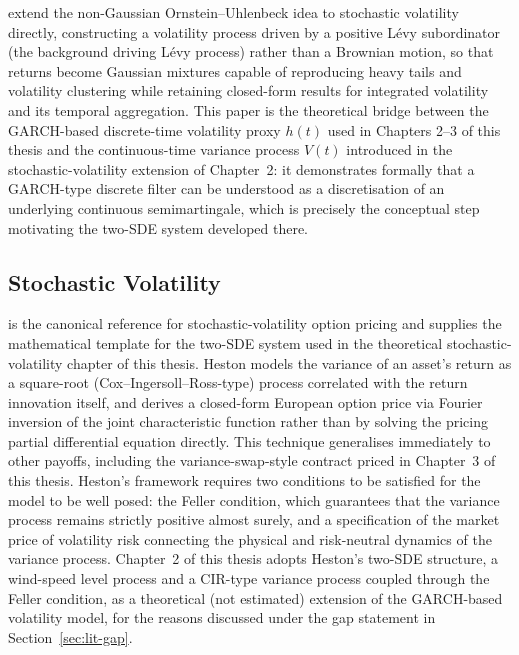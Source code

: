 \documentclass[11pt, a4paper, twoside]{article}
\begin{document}
\citet{BarndorffNielsenShephard2001} extend the non-Gaussian Ornstein--Uhlenbeck idea to stochastic volatility directly, constructing a volatility process driven by a positive Lévy subordinator (the background driving Lévy process) rather than a Brownian motion, so that returns become Gaussian mixtures capable of reproducing heavy tails and volatility clustering while retaining closed-form results for integrated volatility and its temporal aggregation. This paper is the theoretical bridge between the GARCH-based discrete-time volatility proxy $h(t)$ used in Chapters 2--3 of this thesis and the continuous-time variance process $V(t)$ introduced in the stochastic-volatility extension of Chapter~2: it demonstrates formally that a GARCH-type discrete filter can be understood as a discretisation of an underlying continuous semimartingale, which is precisely the conceptual step motivating the two-SDE system developed there.

\subsection{Stochastic Volatility}
\label{sec:lit-sv}

\citet{Heston1993} is the canonical reference for stochastic-volatility option pricing and supplies the mathematical template for the two-SDE system used in the theoretical stochastic-volatility chapter of this thesis. Heston models the variance of an asset's return as a square-root (Cox--Ingersoll--Ross-type) process correlated with the return innovation itself, and derives a closed-form European option price via Fourier inversion of the joint characteristic function rather than by solving the pricing partial differential equation directly. This technique generalises immediately to other payoffs, including the variance-swap-style contract priced in Chapter~3 of this thesis. Heston's framework requires two conditions to be satisfied for the model to be well posed: the Feller condition, which guarantees that the variance process remains strictly positive almost surely, and a specification of the market price of volatility risk connecting the physical and risk-neutral dynamics of the variance process. Chapter~2 of this thesis adopts Heston's two-SDE structure, a wind-speed level process and a CIR-type variance process coupled through the Feller condition, as a theoretical (not estimated) extension of the GARCH-based volatility model, for the reasons discussed under the gap statement in Section~\ref{sec:lit-gap}.
\end{document}
